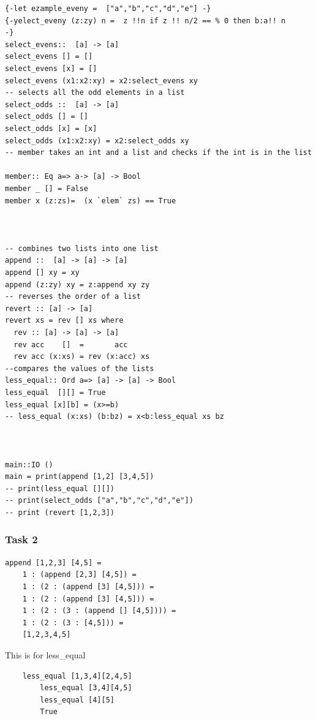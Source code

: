 \documentclass{article}
\theoremstyle{theorem}
\theoremstyle{definition}
\theoremstyle{remark}
\begin{document}
\begin{lstlisting}
{-let ezample_eveny =  ["a","b","c","d","e"] -}
{-yelect_eveny (z:zy) n =  z !!n if z !! n/2 == % 0 then b:a!! n 
-}
select_evens::  [a] -> [a]
select_evens [] = []
select_evens [x] = []
select_evens (x1:x2:xy) = x2:select_evens xy
-- selects all the odd elements in a list
select_odds ::  [a] -> [a]
select_odds [] = []
select_odds [x] = [x]
select_odds (x1:x2:xy) = x2:select_odds xy
-- member takes an int and a list and checks if the int is in the list

member:: Eq a=> a-> [a] -> Bool
member _ [] = False
member x (z:zs)=  (x `elem` zs) == True



-- combines two lists into one list
append ::  [a] -> [a] -> [a]
append [] xy = xy
append (z:zy) xy = z:append xy zy
-- reverses the order of a list
revert :: [a] -> [a]
revert xs = rev [] xs where
  rev :: [a] -> [a] -> [a] 
  rev acc    []  =       acc
  rev acc (x:xs) = rev (x:acc) xs
--compares the values of the lists
less_equal:: Ord a=> [a] -> [a] -> Bool
less_equal  [][] = True
less_equal [x][b] = (x>=b)
-- less_equal (x:xs) (b:bz) = x<b:less_equal xs bz



main::IO ()
main = print(append [1,2] [3,4,5])
-- print(less_equal [][])
-- print(select_odds ["a","b","c","d","e"])
-- print (revert [1,2,3])
\end{lstlisting}
\subsubsection{Task 2}
\begin{lstlisting}
append [1,2,3] [4,5] = 
    1 : (append [2,3] [4,5]) = 
    1 : (2 : (append [3] [4,5])) = 
    1 : (2 : (append [3] [4,5])) = 
    1 : (2 : (3 : (append [] [4,5]))) = 
    1 : (2 : (3 : [4,5])) = 
    [1,2,3,4,5]
\end{lstlisting}
This is for less\_equal
\begin{lstlisting}
	less_equal [1,3,4][2,4,5]
    	less_equal [3,4][4,5]
        less_equal [4][5]
        True
\end{lstlisting}
\end{document}
